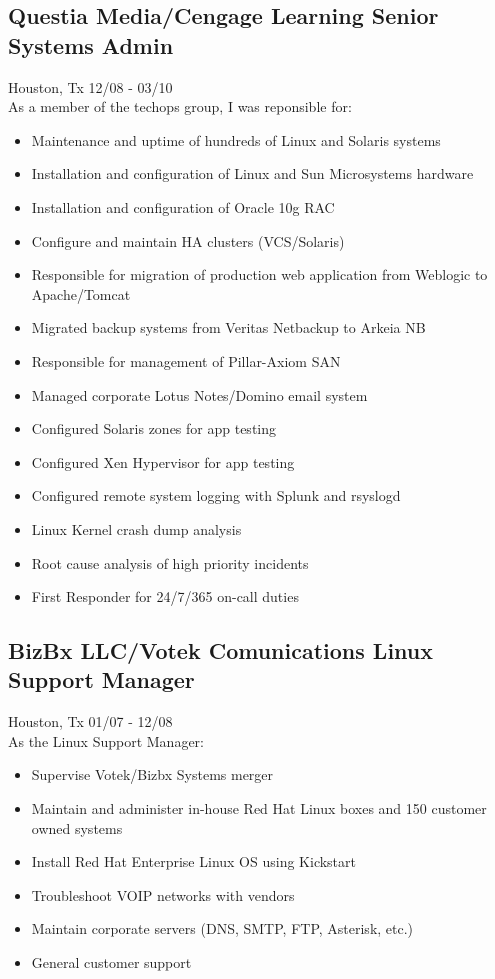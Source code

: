\documentclass{article}
\begin{document}
  \subsection{Questia Media/Cengage Learning \hfill Senior Systems Admin}
  Houston, Tx \hfill 12/08 - 03/10\\
  As a member of the techops group, I was reponsible for:\\
  \begin{itemize}
  \item Maintenance and uptime of hundreds of Linux and Solaris systems
  \item Installation and configuration of Linux and Sun Microsystems hardware
  \item Installation and configuration of Oracle 10g RAC
  \item Configure and maintain HA clusters (VCS/Solaris)
  \item Responsible for migration of production web application from Weblogic to Apache/Tomcat
  \item Migrated backup systems from Veritas Netbackup to Arkeia NB
  \item Responsible for management of Pillar-Axiom SAN
  \item Managed corporate Lotus Notes/Domino email system
  \item Configured Solaris zones for app testing
  \item Configured Xen Hypervisor for app testing
  \item Configured remote system logging with Splunk and rsyslogd
  \item Linux Kernel crash dump analysis
  \item Root cause analysis of high priority incidents
  \item First Responder for 24/7/365 on-call duties
  \end{itemize}

  \subsection{BizBx LLC/Votek Comunications \hfill Linux Support Manager}
  Houston, Tx \hfill 01/07 - 12/08\\
  As the Linux Support Manager:\\
  \begin{itemize}
  \item Supervise Votek/Bizbx Systems merger
  \item Maintain and administer in-house Red Hat Linux boxes and 150 customer owned systems
  \item Install Red Hat Enterprise Linux OS using Kickstart
  \item Troubleshoot VOIP networks with vendors
  \item Maintain corporate servers (DNS, SMTP, FTP, Asterisk, etc.)
  \item General customer support
  \end{itemize}
\end{document}

